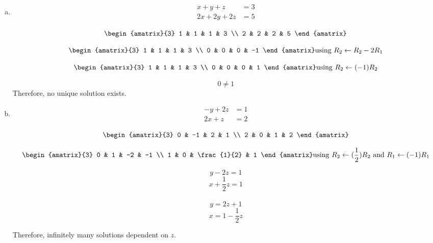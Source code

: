 \documentclass[11pt]{article}
\begin{document}
\begin{enumerate}[(a)]
    \item 
    \begin{align*}
        x + y + z &= 3 \\
        2x + 2y + 2z &= 5
    \end{align*}
    
    \begin{Answer}
		$$\begin{amatrix}{3}
   		1 & 1 & 1 & 3 \\  2 & 2 & 2 & 5
 		\end{amatrix}$$
				
		$$\begin{amatrix}{3}
   		1 & 1 & 1 & 3 \\  0 & 0 & 0 & -1
 		\end{amatrix} \text{using } R_2 \leftarrow R_2 - 2R_1$$
		
		$$\begin{amatrix}{3}
   		1 & 1 & 1 & 3 \\  0 & 0 & 0 & 1
 		\end{amatrix}\text{using }R_2 \leftarrow (-1)R_2$$
		
		$$0 \neq 1$$
		Therefore, no unique solution exists.
	\end{Answer}
    
    \item 
    \begin{align*}
        -y + 2z &= 1 \\
        2x  + z &= 2
    \end{align*}
    
    \begin{Answer}
		$$\begin{amatrix}{3}
   		0 & -1 & 2 & 1 \\  2 & 0 & 1 & 2
 		\end{amatrix}$$
		
		$$\begin{amatrix}{3}
   		0 & 1 & -2 & -1 \\  1 & 0 & \frac{1}{2} & 1
 		\end{amatrix} \text{using } R_2 \leftarrow (\frac{1}{2})R_2 \text{ and } R_1 \leftarrow (-1)R_1$$
		
		$$y - 2z = 1$$
		$$x + \frac{1}{2}z = 1$$\\
		$$y = 2z + 1$$
		$$x = 1 - \frac{1}{2}z$$
		
		Therefore, infinitely many solutions dependent on $z$.
	\end{Answer}
    

\end{enumerate}
\end{document}
